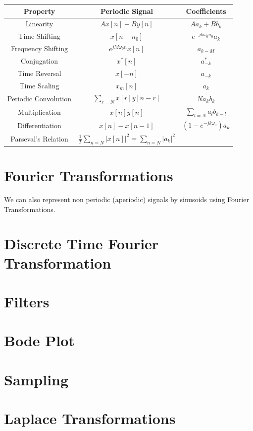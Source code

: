\documentclass[12pt,letterpaper]{article} \usepackage{amsmath} \usepackage{graphicx} \usepackage[margin=1in]{geometry} \usepackage{longtable}  \usepackage{amssymb}
\begin{document}
	\begin{center}
		\begin{tabular}{|c||c|c|}
			\hline
			Property & Periodic Signal & Coefficients \\
			\hline\hline
			Linearity & $A x[n] + B y[n]$ & $A a_k + B b_k$ \\
			\hline
			Time Shifting & $x[n-n_0]$ & $e^{-jk\omega_0 n_0} a_k$ \\
			\hline
			Frequency Shifting & $e^{jM\omega_0 n} x[n]$ & $a_{k-M}$ \\
			\hline
			Conjugation & $x^*[n]$ & $a^*_{-k}$ \\
			\hline
			Time Reversal & $x[-n]$ & $a_{-k}$ \\
			\hline
			Time Scaling & $x_m[n]$ & $a_k$ \\
			\hline
			Periodic Convolution & $\sum_{r=N} x[r] y[n-r]$ & $N a_k b_k$ \\
			\hline
			Multiplication & $x[n] y[n]$ & $\sum_{l=N} a_l b_{k-l}$ \\
			\hline
			Differentiation & $x[n] - x[n-1]$ & $(1-e^{-jk\omega_0})a_k$ \\
			\hline
			Parseval's Relation & $\frac{1}{T} \sum_{n=N} |x[n]|^2 = \sum_{n=N} |a_k|^2$ &  \\
			\hline
		\end{tabular}
	\end{center}
	
	\section{Fourier Transformations}
	We can also represent non periodic (aperiodic) signals by sinusoids using Fourier Transformations.
	
	\section{Discrete Time Fourier Transformation}
	
	\section{Filters}
	
	\section{Bode Plot}
	
	\section{Sampling}
	
	\section{Laplace Transformations}
	
	
\end{document}
